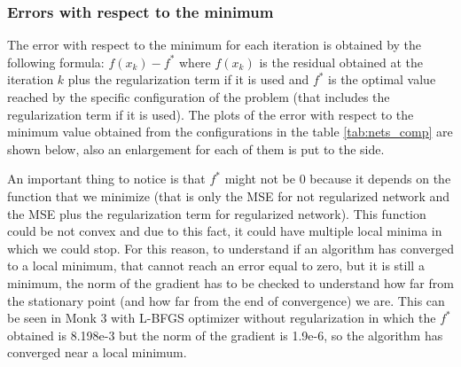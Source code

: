 \subsubsection{Errors with respect to the minimum}
\label{sec:minimum_error}
The error with respect to the minimum for each iteration is obtained by the following formula: $ f(x_k) - f^*$ where  $f(x_{k})$ is the residual obtained at the iteration $k$ plus the  regularization term if it is used and $f^*$ is the optimal value reached by the specific configuration of the problem (that includes the regularization term if it is used). The plots of the error with respect to the minimum value obtained from the configurations in the table \ref{tab:nets_comp} are shown below, also an enlargement for each of them is put to the side.

An important thing to notice is that $f^*$ might not be 0 because it depends on the function that we minimize (that is only the MSE for not regularized network and the MSE plus the regularization term for regularized network). This function could be not convex and due to this fact, it could have multiple local minima in which we could stop. For this reason, to understand if an algorithm has converged to a local minimum, that cannot reach an error equal to zero, but it is still a minimum, the norm of the gradient has to be checked to understand how far from the stationary point (and how far from the end of convergence) we are. This can be seen in Monk 3 with L-BFGS optimizer without regularization in which the $f^*$ obtained is 8.198e-3 but the norm of the gradient is 1.9e-6, so the algorithm has converged near a local minimum.

